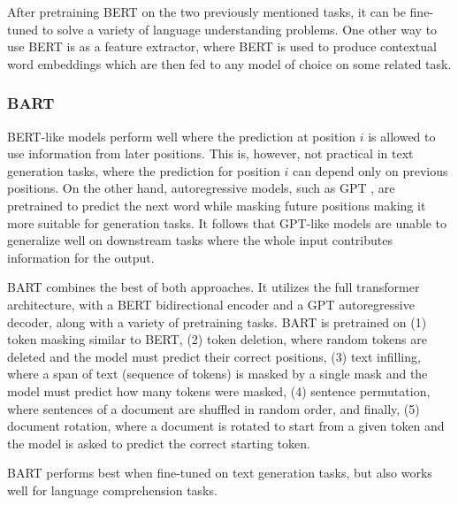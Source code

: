 After pretraining BERT on the two previously mentioned tasks, it can be fine-tuned to solve a variety of language understanding problems. One other way to use BERT is as a feature extractor, where BERT is used to produce contextual word embeddings which are then fed to any model of choice on some related task.

\subsubsection{BART}
\label{sec:bart_intro}

BERT-like models perform well where the prediction at position $i$ is allowed to use information from later positions. This is, however, not practical in text generation tasks, where the prediction for position $i$ can depend only on previous positions. On the other hand, autoregressive models, such as GPT \citep{radford2018improving}, are pretrained to predict the next word while masking future positions making it more suitable for generation tasks. It follows that GPT-like models are unable to generalize well on downstream tasks where the whole input contributes information for the output.

BART \citep{lewis2019bart} combines the best of both approaches. It utilizes the full transformer architecture, with a BERT bidirectional encoder and a GPT autoregressive decoder, along with a variety of pretraining tasks. BART is pretrained on (1) token masking similar to BERT, (2) token deletion, where random tokens are deleted and the model must predict their correct positions, (3) text infilling, where a span of text (sequence of tokens) is masked by a single mask and the model must predict how many tokens were masked, (4) sentence permutation, where sentences of a document are shuffled in random order, and finally, (5) document rotation, where a document is rotated to start from a given token and the model is asked to predict the correct starting token.

BART performs best when fine-tuned on text generation tasks, but also works well for language comprehension tasks.

